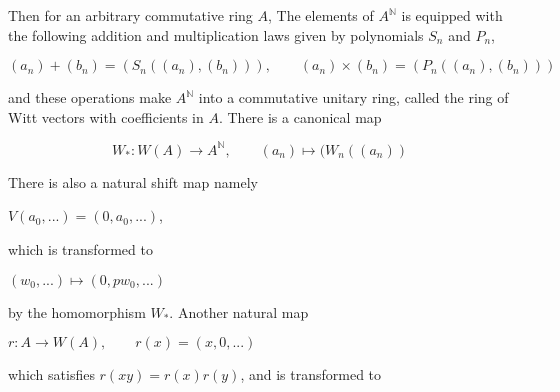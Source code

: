 \documentclass[12pt,twoside]{amsart}
\begin{document}
\vspace{0.5cm}

\noindent
Then for an arbitrary commutative ring $A$, The elements of $A^{\mathbb{N}}$ is equipped with the following addition and multiplication laws given by polynomials $S_n$ and $P_n$,

\[ (a_n)+(b_n)= (S_n((a_n),(b_n))) , \qquad (a_n) \times (b_n)= (P_n((a_n),(b_n))) \]

\vspace{0.5cm}

\noindent
and these operations make $A^{\mathbb{N}}$ into a commutative unitary ring, called the ring of Witt vectors with coefficients in $A$. There is a canonical map 

\[ W_*:W(A) \to A^{\mathbb{N}}, \qquad (a_n) \mapsto (W_n((a_n)) \]

\vspace{0.5cm}

\noindent
There is also a natural shift map namely

\vspace{0.5cm}

\begin{center}
$V(a_0,...)=(0,a_0,...)$, 
\end{center} 

\vspace{0.5cm}

\noindent
which is transformed to 

\vspace{0.5cm}

\begin{center}
$(w_0,...) \mapsto (0,pw_0,...)$ 
\end{center}

\vspace{0.5cm}

\noindent
by the homomorphism $W_*$. Another natural map 

\vspace{0.5cm}

\begin{center}
$r:A \to W(A), \qquad r(x)=(x,0,...)$ \\ 
\end{center}

\vspace{0.5cm}

\noindent
which satisfies $r(xy)=r(x)r(y)$, and is transformed to 

\vspace{0.5cm}
\end{document}
